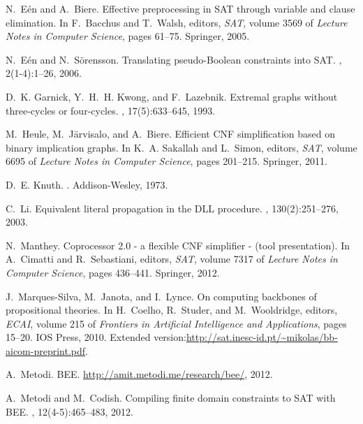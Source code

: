 \documentclass[runningheads,a4paper]{llncs}
\newcommand{\bee}{\textsf{BEE}}
\begin{document}
\begin{thebibliography}{10}
N.~E{\'e}n and A.~Biere.
\newblock Effective preprocessing in {SAT} through variable and clause
  elimination.
\newblock In F.~Bacchus and T.~Walsh, editors, {\em SAT}, volume 3569 of {\em
  Lecture Notes in Computer Science}, pages 61--75. Springer, 2005.

N.~E{\'e}n and N.~S{\"o}rensson.
\newblock Translating pseudo-{Boolean} constraints into {SAT}.
, 2(1-4):1--26, 2006.

D.~K. Garnick, Y.~H.~H. Kwong, and F.~Lazebnik.
\newblock Extremal graphs without three-cycles or four-cycles.
, 17(5):633--645, 1993.

M.~Heule, M.~J{\"a}rvisalo, and A.~Biere.
\newblock Efficient {CNF} simplification based on binary implication graphs.
\newblock In K.~A. Sakallah and L.~Simon, editors, {\em SAT}, volume 6695 of
  {\em Lecture Notes in Computer Science}, pages 201--215. Springer, 2011.

D.~E. Knuth.
.
\newblock Addison-Wesley, 1973.

C.~Li.
\newblock Equivalent literal propagation in the {DLL} procedure.
, 130(2):251--276, 2003.

N.~Manthey.
\newblock Coprocessor 2.0 - a flexible {CNF} simplifier - (tool presentation).
\newblock In A.~Cimatti and R.~Sebastiani, editors, {\em SAT}, volume 7317 of
  {\em Lecture Notes in Computer Science}, pages 436--441. Springer, 2012.

J.~Marques-Silva, M.~Janota, and I.~Lynce.
\newblock On computing backbones of propositional theories.
\newblock In H.~Coelho, R.~Studer, and M.~Wooldridge, editors, {\em ECAI},
  volume 215 of {\em Frontiers in Artificial Intelligence and Applications},
  pages 15--20. IOS Press, 2010.
\newblock Extended
  version:\url{http://sat.inesc-id.pt/~mikolas/bb-aicom-preprint.pdf}.

A.~Metodi.
\newblock \bee.
\newblock \url{http://amit.metodi.me/research/bee/}, 2012.

A.~Metodi and M.~Codish.
\newblock Compiling finite domain constraints to {SAT} with {{\textsf{BEE}}}.
, 12(4-5):465--483, 2012.


\end{thebibliography}
\end{document}

